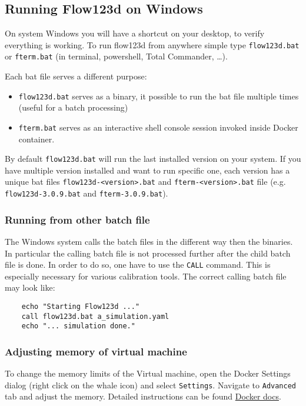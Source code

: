 \subsection{Running Flow123d on Windows}
On system Windows you will have a shortcut on your desktop, to verify everything is working. To run flow123d from anywhere simple type
\verb'flow123d.bat' or \verb'fterm.bat' (in terminal, powershell, Total Commander, \dots).

Each bat file serves a different purpose:
\begin{itemize}
  \item \verb'flow123d.bat' serves as a binary, it possible to run the bat file multiple times (useful for a batch processing)
  \item \verb'fterm.bat' serves as an interactive shell console session invoked inside Docker container.
\end{itemize}

By default \verb'flow123d.bat' will run the last installed version on your system. If you have multiple version installed and want to run specific one, each version has a unique bat files \verb'flow123d-<version>.bat' and \verb'fterm-<version>.bat' file (e.g. \verb'flow123d-3.0.9.bat' and \verb'fterm-3.0.9.bat').


\subsubsection{Running from other batch file}
The Windows system calls the batch files in the different way then the binaries. In particular the calling batch file is not processed further after the child batch
file is done. In order to do so, one have to use the \verb'CALL' command. This is especially necessary for various calibration tools. The correct calling batch file
may look like:
\begin{verbatim}
    echo "Starting Flow123d ..."
    call flow123d.bat a_simulation.yaml
    echo "... simulation done."
\end{verbatim}


\subsubsection{Adjusting memory of virtual machine}
To change the memory limits of the Virtual machine, open the Docker Settings dialog (right click on the whale icon) and select \verb'Settings'.
Navigate to \verb'Advanced' tab and adjust the memory. Detailed instructions can be found \href{https://docs.docker.com/desktop/windows/#advanced}{Docker docs}.


